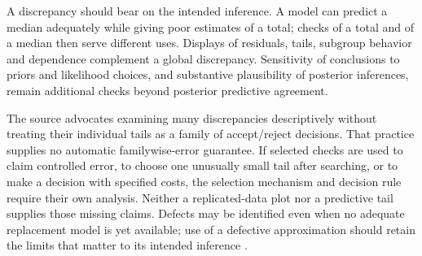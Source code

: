 A discrepancy should bear on the intended inference. A model can predict
a median adequately while giving poor estimates of a total; checks of a
total and of a median then serve different uses. Displays of residuals,
tails, subgroup behavior and dependence complement a global discrepancy.
Sensitivity of conclusions to priors and likelihood choices, and substantive
plausibility of posterior inferences, remain additional checks beyond
posterior predictive agreement.

The source advocates examining many discrepancies descriptively without
treating their individual tails as a family of accept/reject decisions.
That practice supplies no automatic familywise-error guarantee. If selected
checks are used to claim controlled error, to choose one unusually small
tail after searching, or to make a decision with specified costs, the
selection mechanism and decision rule require their own analysis. Neither
a replicated-data plot nor a predictive tail supplies those missing claims.
Defects may be identified even when no adequate replacement model is yet
available; use of a defective approximation should retain the limits that
matter to its intended inference \cite[sec.~4]{GelmanMengStern1996Main}.
